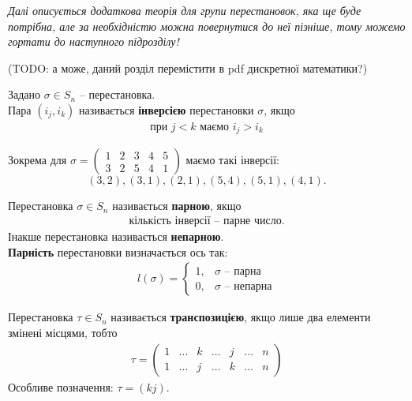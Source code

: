\documentclass{math_library}
\begin{document}
\textit{Далі описується додаткова теорія для групи перестановок, яка ще буде потрібна, але за необхідністю можна повернутися до неї пізніше, тому можемо гортати до наступного підрозділу!}

(TODO: а може, даний розділ перемістити в pdf дискретної математики?)

\begin{definition}
Задано $\sigma \in S_n$ -- перестановка.\\
Пара $(i_j,i_k)$ називається \textbf{інверсією} перестановки $\sigma$, якщо 
\begin{align*}
\text{при } j < k \text{ маємо  } i_j > i_k
\end{align*}
\end{definition}

\begin{example}
Зокрема для $\sigma = \begin{pmatrix}
1 & 2 & 3 & 4 & 5\\
3 & 2 & 5 & 4 & 1
\end{pmatrix}$ маємо такі інверсії: 
\[
(3,2), (3,1), (2,1), (5,4), (5,1), (4,1).
\]
\end{example}

\begin{definition}
Перестановка $\sigma \in S_n$ називається \textbf{парною}, якщо
\begin{align*}
\text{кількість інверсії -- парне число.}
\end{align*}
Інакше перестановка називається \textbf{непарною}.\\
\textbf{Парність} перестановки визначається ось так:
\begin{align*}
l(\sigma) = \begin{cases} 1, & \sigma \text{ -- парна}\\ 0, & \sigma \text{ -- непарна} \end{cases}
\end{align*}
\end{definition}

\begin{definition}
Перестановка $\tau \in S_n$ називається \textbf{транспозицією}, якщо лише два елементи змінені місцями, тобто
\begin{align*}
\tau = \begin{pmatrix}
1 & \dots & k & \dots & j & \dots & n \\
1 & \dots & j & \dots & k & \dots & n
\end{pmatrix}
\end{align*}
Особливе позначення: $\tau = (kj)$.
\end{definition}
\end{document}
